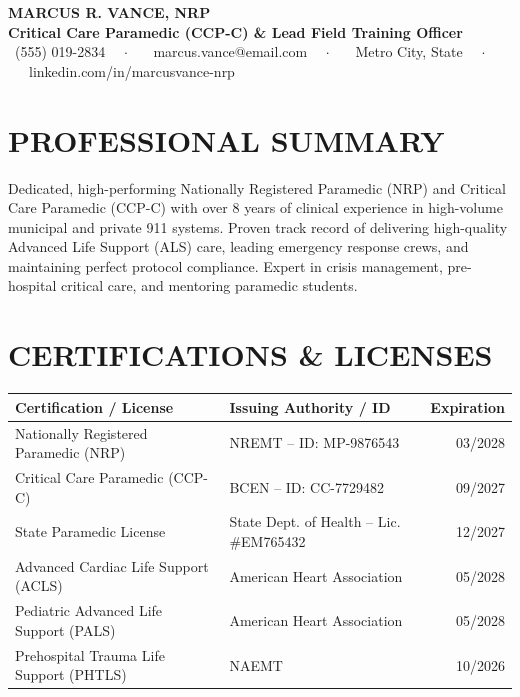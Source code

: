 \documentclass[10pt,letterpaper]{article}
\begin{document}
\begin{center}
    {\Huge \bfseries \color{primary} MARCUS R. VANCE, NRP} \\
    \vspace{2pt}
    {\color{accent}\bfseries Critical Care Paramedic (CCP-C) \& Lead Field Training Officer} \\
    \vspace{4pt}
    \small
    \faPhone\ (555) 019-2834 \ \ $\cdot$ \ \ 
    \faEnvelope\ marcus.vance@email.com \ \ $\cdot$ \ \ 
    \faMapMarker\ Metro City, State \ \ $\cdot$ \ \ 
    \faLinkedin\ linkedin.com/in/marcusvance-nrp
\end{center}

\vspace{-4pt}

\section*{PROFESSIONAL SUMMARY}
Dedicated, high-performing Nationally Registered Paramedic (NRP) and Critical Care Paramedic (CCP-C) with over 8 years of clinical experience in high-volume municipal and private 911 systems. Proven track record of delivering high-quality Advanced Life Support (ALS) care, leading emergency response crews, and maintaining perfect protocol compliance. Expert in crisis management, pre-hospital critical care, and mentoring paramedic students.

\section*{CERTIFICATIONS \& LICENSES}
\begin{tabularx}{\textwidth}{X l r}
\toprule
\textbf{Certification / License} & \textbf{Issuing Authority / ID} & \textbf{Expiration} \\
\midrule
Nationally Registered Paramedic (NRP) & NREMT -- ID: MP-9876543 & 03/2028 \\
Critical Care Paramedic (CCP-C) & BCEN -- ID: CC-7729482 & 09/2027 \\
State Paramedic License & State Dept. of Health -- Lic. \#EM765432 & 12/2027 \\
Advanced Cardiac Life Support (ACLS) & American Heart Association & 05/2028 \\
Pediatric Advanced Life Support (PALS) & American Heart Association & 05/2028 \\
Prehospital Trauma Life Support (PHTLS) & NAEMT & 10/2026 \\
\bottomrule
\end{tabularx}
\end{document}
